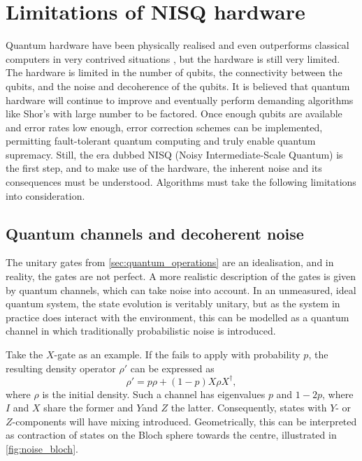 \section{Limitations of NISQ hardware}
\label{sec:nisq}
Quantum hardware have been physically realised and even outperforms classical computers in very contrived situations \cite{arute2019, zhong2020, madsen2022}, but the hardware is still very limited.
The hardware is limited in the number of qubits, the connectivity between the qubits, and the noise and decoherence of the qubits.
It is believed that quantum hardware will continue to improve and eventually perform demanding algorithms like Shor's with large number to be factored.
Once enough qubits are available and error rates low enough, error correction schemes can be implemented, permitting fault-tolerant quantum computing and truly enable quantum supremacy.
Still, the era dubbed NISQ (Noisy Intermediate-Scale Quantum) is the first step, and to make use of the hardware, the inherent noise and its consequences must be understood.
Algorithms must take the following limitations into consideration.

\subsection{Quantum channels and decoherent noise}
The unitary gates from \cref{sec:quantum_operations} are an idealisation, and in reality, the gates are not perfect.
A more realistic description of the gates is given by quantum channels, which can take noise into account.
In an unmeasured, ideal quantum system, the state evolution is veritably unitary, but as the system in practice does interact with the environment, this can be modelled as a quantum channel in which traditionally probabilistic noise is introduced.

Take the $X$-gate as an example.
If the fails to apply with probability $p$, the resulting density operator $\rho'$ can be expressed as
\begin{equation}
    \rho' = p\rho + (1-p)X\rho X^\dagger,
\end{equation}
where $\rho$ is the initial density.
Such a channel has eigenvalues $p$ and $1-2p$, where $I$ and $X$ share the former and $Y$and $Z$ the latter.
Consequently, states with $Y$- or $Z$-components will have mixing introduced.
Geometrically, this can be interpreted as contraction of states on the Bloch sphere towards the centre, illustrated in \cref{fig:noise_bloch}.

